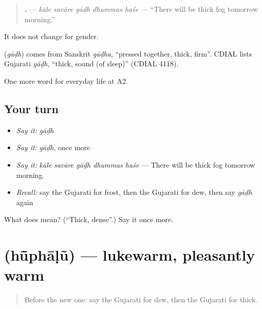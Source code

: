 \begin{quote}
\textbf{    .} — \emph{kāle savāre gāḍh dhummas haśe} — \textquotedblleft{}There will be thick fog tomorrow morning.\textquotedblright{}
\end{quote}

It does not change for gender.

\begin{cousinweb}
\textbf{} (\emph{gāḍh}) comes from Sanskrit \emph{gāḍha}, \textquotedblleft{}pressed together, thick, firm\textquotedblright{}. CDIAL lists Gujarati \emph{gāḍh}, \textquotedblleft{}thick, sound (of sleep)\textquotedblright{} (CDIAL 4118).
\end{cousinweb}

\begin{grammarlens}[title={What you've built}]
One more word for everyday life at A2.
\end{grammarlens}

\subsection*{Your turn}
\begin{itemize}
\raggedright
  \item \emph{Say it:} \emph{gāḍh}
  \item \emph{Say it:} \emph{gāḍh}, once more
  \item \emph{Say it:} \emph{kāle savāre gāḍh dhummas haśe} — There will be thick fog tomorrow morning.
  \item \emph{Recall:} say the Gujarati for frost, then the Gujarati for dew, then say \emph{gāḍh} again
\end{itemize}

\begin{tcolorbox}[breakable,colback=teal!4,colframe=teal!35!black,title={Before you move on}]
What does  mean? (\textquotedblleft{}Thick, dense\textquotedblright{}.) Say it once more.
\end{tcolorbox}
\section[\texorpdfstring{\gu{હૂંફાળું} (hū̃phāḷũ)}{હૂંફાળું (hū̃phāḷũ)}]{ (hū̃phāḷũ) — lukewarm, pleasantly warm}

\label{lesson:GU-C215-huphalu}



\begin{quote}
Before the new one: say the Gujarati for dew, then the Gujarati for thick.
\end{quote}

